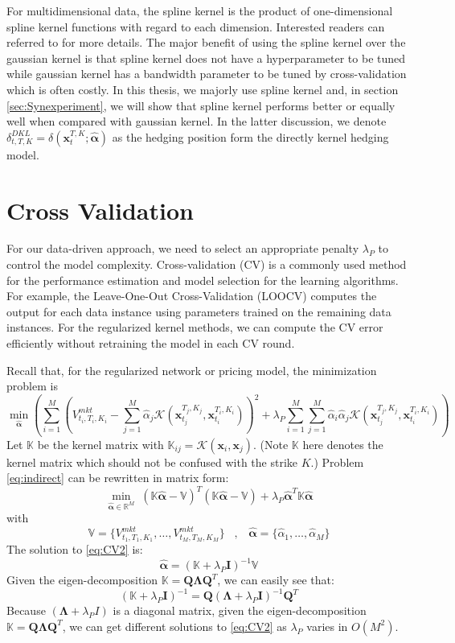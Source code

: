 \documentclass[letterpaper,12pt,titlepage,oneside,final]{book}
\numberwithin{equation}{section}
\theoremstyle{definition}
\newcommand{\vx}{\mathbf{x}}
\newcommand{\Real}{\mathbb{R}}
\newcommand{\valpha}{\pmb{\widehat{\alpha}}}
\newcommand{\vK}{\mathbb{K}}
\newcommand{\Vmkt}{V^{mkt}}
\newcommand{\vecVmkt}{\mathbb{V}}
\begin{document}
For multidimensional data, the spline kernel is the product of one-dimensional spline kernel functions with regard to each dimension. Interested readers can referred to \citep{vapnik1998statistical} for more details. The major benefit of using the spline kernel over the gaussian kernel  is that spline kernel does not have a hyperparameter to be tuned while  gaussian kernel has  a bandwidth parameter to be tuned by cross-validation which is often costly. In this thesis, we majorly use spline kernel and, in section 
\ref{sec:Synexperiment}, we will show that spline kernel performs better or equally well when compared with gaussian kernel.  In the latter discussion, we denote $\delta^{DKL}_{t,T,K}= \delta(\vx_{t}^{T,K};\mathbf{\valpha})$ as the hedging position form the directly kernel hedging model.


\section{Cross Validation} \label{sec:cross}
 For our data-driven approach, we need to select an appropriate penalty $\lambda_P$ to control the model complexity. Cross-validation (CV) is a commonly used method for the performance estimation and model selection for the learning algorithms. For example, the Leave-One-Out Cross-Validation (LOOCV) computes the output for each data instance using parameters trained on the remaining data instances. For the regularized kernel methods, we can compute the CV error efficiently without retraining the model in each CV round.


Recall that, for the regularized network or pricing model, the minimization problem is
\[
\min_{\mathbf{\valpha}} \left(  \sum_{i=1}^M \left( \Vmkt_{t_i,T_i,K_i}-\sum_{j=1}^M \widehat{\alpha}_j \mathcal{K}(\vx_{t_j}^{T_j,K_j},\vx_{t_i}^{T_i,K_i}) \right)^2+\lambda_P \sum_{i=1}^M\sum_{j=1}^M  \widehat{\alpha}_i \widehat{\alpha}_j \mathcal{K}(\vx_{t_j}^{T_j,K_j},\vx_{t_i}^{T_i,K_i})\right)
 \]
Let $\vK$ be the kernel matrix with $\vK_{ij}=\mathcal{K}(\mathbf{x}_i,\mathbf{x}_j)$. (Note $\vK$ here denotes the kernel matrix which should not be confused with the strike $K$.) Problem \eqref{eq:indirect} can be rewritten in matrix form:
\begin{equation}
\min_{\valpha \in \Real^M} \; ( \vK \valpha - \vecVmkt)^T ( \vK \valpha -\vecVmkt)+ \lambda_P \valpha^T\vK\valpha
\label{eq:CV2}
\end{equation}
with
\[
	\vecVmkt=\{
	\Vmkt_{t_1,T_1,K_1},\dots,	\Vmkt_{t_M,T_M,K_M}
	\}	\;\;\;,\;\;\; \valpha=\{\widehat{\alpha}_1,\dots,\widehat{\alpha}_M\}
\]
The solution to \eqref{eq:CV2} is:
\[
\valpha  =(\vK+\lambda_P \pmb{I})^{-1}\vecVmkt
\]
Given the eigen-decomposition $\vK=\pmb{Q} \pmb{\Lambda} \pmb{Q}^T$, we can easily see that:
\begin{equation}\label{eq:eig}
(\vK+\lambda_P \pmb{I})^{-1}=\pmb{Q}(\pmb{\Lambda}+\lambda_P \pmb{I})^{-1} \pmb{Q}^T
\end{equation}
Because $(\pmb{\Lambda}+\lambda_P I)$ is a diagonal matrix, given the eigen-decomposition $\vK=\pmb{Q} \pmb{\Lambda} \pmb{Q}^T$, we can get different solutions to \eqref{eq:CV2}  as $\lambda_P$ varies in $O(M^2)$.
\end{document}
